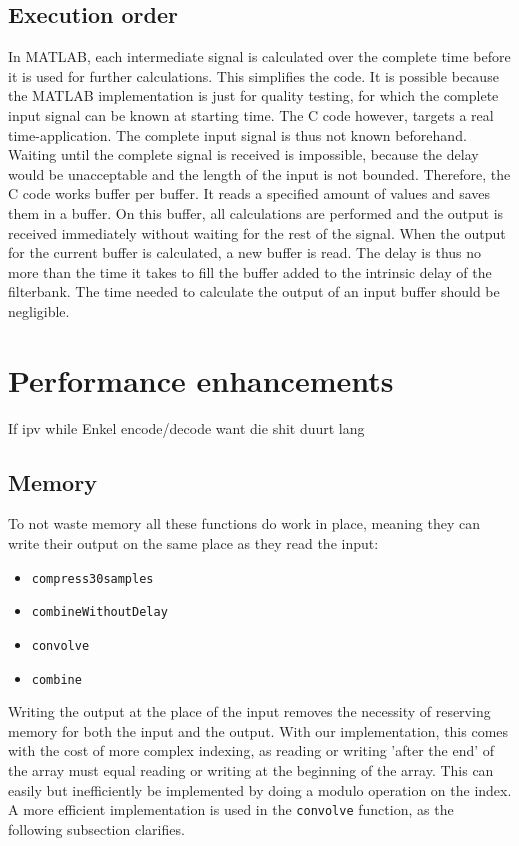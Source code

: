\documentclass[a4paper]{article}
\begin{document}
\subsection{Execution order}
In MATLAB, each intermediate signal is calculated over the complete time before it is used for further calculations. This simplifies the code. It is possible because the MATLAB implementation is just for quality testing, for which the complete input signal can be known at starting time. The C code however, targets a real time-application. The complete input signal is thus not known beforehand. Waiting until the complete signal is received is impossible, because the delay would be unacceptable and the length of the input is not bounded. Therefore, the C code works buffer per buffer. It reads a specified amount of values and saves them in a buffer. On this buffer, all calculations are performed and the output is received immediately without waiting for the rest of the signal. When the output for the current buffer is calculated, a new buffer is read. The delay is thus no more than the time it takes to fill the buffer added to the intrinsic delay of the filterbank. The time needed to calculate the output of an input buffer should be negligible. 

\section{Performance enhancements}
If ipv while
Enkel encode/decode want die shit duurt lang
\subsection{Memory}
To not waste memory all these functions do work in place, meaning they can write their output on the same place as they read the input:
\begin{itemize}[noitemsep]
\item \texttt{compress30samples}
\item \texttt{combineWithoutDelay}
\item \texttt{convolve}
\item \texttt{combine}
\end{itemize}
Writing the output at the place of the input removes the necessity of reserving memory for both the input and the output. With our implementation, this comes with the cost of more complex indexing, as reading or writing 'after the end' of the array must equal reading or writing at the beginning of the array. This can easily but inefficiently be implemented by doing a modulo operation on the index. A more efficient implementation is used in the \texttt{convolve} function, as the following subsection clarifies.
\end{document}
